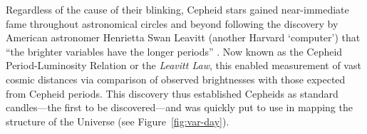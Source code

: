 Regardless of the cause of their blinking, Cepheid stars gained near-immediate fame throughout astronomical circles and beyond following the discovery by American astronomer Henrietta Swan Leavitt (another Harvard `computer') that ``the brighter variables have the longer periods'' \citep{1908AnHar..60...87L, 1912HarCi.173....1L}. 
Now known as the Cepheid Period-Luminosity Relation or the \emph{Leavitt Law}, this enabled measurement of vast cosmic distances via comparison of observed brightnesses with those expected from Cepheid periods. 
This discovery thus established Cepheids as standard candles---the first to be discovered---and was quickly put to use in mapping the structure of the Universe (see Figure~\ref{fig:var-day}). 




